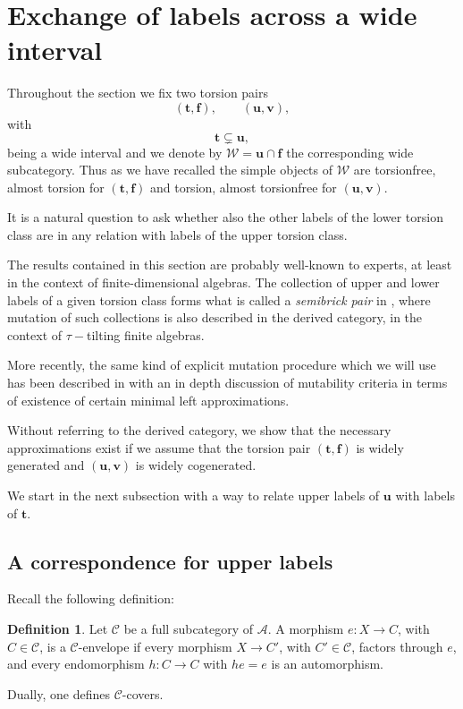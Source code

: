 \documentclass[11pt]{amsart}
\theoremstyle{definition}
\newtheorem{definition}[theorem]{Definition}
\newcommand{\A}{\mathcal A}
\newcommand{\tpair}[2]{(\mathbf{#1}, \mathbf{#2})  }
\begin{document}
\section{Exchange of labels across a wide interval}

 Throughout the section we fix two torsion pairs
\[
(\mathbf t,\mathbf f),\qquad (\mathbf u,\mathbf v),
\]
with
\[
\mathbf t\subsetneq \mathbf u,
\]
being a wide interval 
and we denote by \(\mathcal{W} = \mathbf{u} \cap \mathbf{f} \) the corresponding wide subcategory. Thus as we have recalled the simple objects of \(\mathcal{W}\) are torsionfree, almost torsion for \((\mathbf t,\mathbf f)\) and torsion, almost torsionfree for \((\mathbf u,\mathbf v)\).

It is a natural question to ask whether also the other labels of the lower torsion class are in any relation with labels of the upper torsion class. 

The results contained in this section are probably well-known to experts, at least in the context of finite-dimensional algebras. The collection of upper and lower labels of a given torsion class forms what is called a \emph{semibrick pair} in \cite{BH}, where mutation of such collections is also described in the derived category, in the context of  \( \tau-\)tilting finite algebras.

More recently, the same kind of explicit mutation procedure which we will use has been described in \cite[Theorem 2.5]{MutSimple} with an in depth discussion of mutability criteria in terms of existence of certain minimal left approximations.

Without referring to the derived category, we show that the necessary approximations exist  if we assume that  the torsion pair \( \tpair{t}{f} \) is widely generated and \( \tpair{u}{v} \) is widely cogenerated.

We start in the next subsection with a way to relate upper labels of \( \mathbf{u} \) with labels of \( \mathbf{t} \).

\subsection{A correspondence for upper labels}

Recall the following definition:

\begin{definition}
Let \(\mathcal C\) be a full subcategory of \(\A\). A morphism \(e:X\to C\), with \(C\in\mathcal C\), is a \(\mathcal C\)-envelope if every morphism \(X\to C'\), with \(C'\in\mathcal C\), factors through \(e\), and every endomorphism \(h:C\to C\) with \(he=e\) is an automorphism.

Dually, one defines \( \mathcal C\)-covers.
\end{definition}
\end{document}
